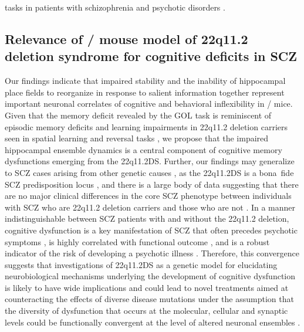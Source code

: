 tasks in patients with schizophrenia and psychotic disorders \citep{Armstrong2012}\citep{Colgin2008}\citep{Hanlon2006}\citep{Sheffield2012}\citep{Wilkins2013}.

\subsection{Relevance of \df/ mouse model of 22q11.2 deletion syndrome for cognitive deficits in SCZ}

Our findings indicate that impaired stability and the inability of hippocampal place fields to reorganize in response to salient information together represent important neuronal correlates of cognitive and behavioral inflexibility in \df/ mice.  Given that the memory deficit revealed by the GOL task is reminiscent of episodic memory deficits and learning impairments in 22q11.2 deletion carriers \citep{McCabe2011} seen in spatial learning \citep{Hanlon2006}\citep{Wilkins2013} and reversal tasks \citep{Debbane2008b}\citep{Leeson2009}, we propose that the impaired hippocampal ensemble dynamics is a central component of cognitive memory dysfunctions emerging from the 22q11.2DS.  Further, our findings may generalize to SCZ cases arising from other genetic causes \citep{Rodriguez-Murillo2012}, as the 22q11.2DS is a bona~fide SCZ predisposition locus \citep{Marshall2016},  and there is a large body of data suggesting that there are no major clinical differences in the core SCZ phenotype between individuals with SCZ who are 22q11.2 deletion carriers and those who are not \citep{Bassett2003}\citep{Bassett1998}. In a manner indistinguishable between SCZ patients with and without the 22q11.2 deletion, cognitive dysfunction is a key manifestation of SCZ that often precedes psychotic symptoms \citep{Larson2010}\citep{Reichenberg2010}\citep{Seidman2010}, is highly correlated with functional outcome \citep{Green2004}\citep{Kahn2013}\citep{Rosenheck2006}, and is a robust indicator of the risk of developing a psychotic illness \citep{Butcher2012}\citep{Goldenberg2012}\citep{Schneider2014}\citep{Vorstman2015}. Therefore, this convergence suggests that investigations of 22q11.2DS as a genetic model for elucidating neurobiological mechanisms underlying the development of cognitive dysfunction is likely to have wide implications and could lead to novel treatments aimed at counteracting the effects of diverse disease mutations under the assumption that the diversity of dysfunction that occurs at the molecular, cellular and synaptic levels could be functionally convergent at the level of altered  neuronal ensembles \citep{Crabtree2014}\citep{Lisman2012}\citep{Mukai2015}.

